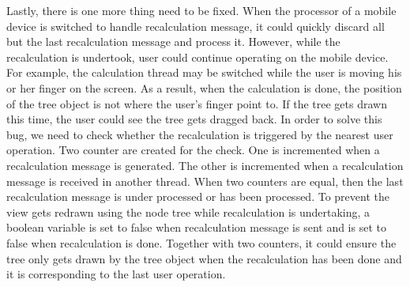\documentclass[MSc]{icldt}
\begin{document}

Lastly, there is one more thing need to be fixed. When the processor of a mobile device is switched to handle recalculation message, it could quickly discard all but the last recalculation message and process it. However, while the recalculation is undertook, user could continue operating on the mobile device. For example, the calculation thread may be switched while the user is moving his or her finger on the screen. As a result, when the calculation is done, the position of the tree object is not where the user's finger point to. If the tree gets drawn this time, the user could see the tree gets dragged back. In order to solve this bug, we need to check whether the recalculation is triggered by the nearest user operation. Two counter are created for the check. One is incremented when a recalculation message is generated. The other is incremented when a recalculation message is received in another thread. When two counters are equal, then the last recalculation message is under processed or has been processed. To prevent the view gets redrawn using the node tree while recalculation is undertaking, a boolean variable is set to false when recalculation message is sent and is set to false when recalculation is done. Together with two counters, it could ensure the tree only gets drawn by the tree object when the recalculation has been done and it is corresponding to the last user operation. 
\end{document}
